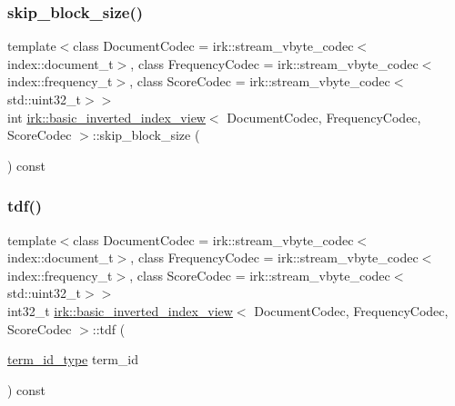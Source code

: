 \mbox{\label{classirk_1_1basic__inverted__index__view_a9d250a6240d62fcb5fa8c2287c6b9194}} 
\subsubsection{\texorpdfstring{skip\+\_\+block\+\_\+size()}{skip\_block\_size()}}
{\footnotesize\ttfamily template$<$class Document\+Codec  = irk\+::stream\+\_\+vbyte\+\_\+codec$<$index\+::document\+\_\+t$>$, class Frequency\+Codec  = irk\+::stream\+\_\+vbyte\+\_\+codec$<$index\+::frequency\+\_\+t$>$, class Score\+Codec  = irk\+::stream\+\_\+vbyte\+\_\+codec$<$std\+::uint32\+\_\+t$>$$>$ \\
int \mbox{\hyperlink{classirk_1_1basic__inverted__index__view}{irk\+::basic\+\_\+inverted\+\_\+index\+\_\+view}}$<$ Document\+Codec, Frequency\+Codec, Score\+Codec $>$\+::skip\+\_\+block\+\_\+size (\begin{DoxyParamCaption}{ }\end{DoxyParamCaption}) const\hspace{0.3cm}{\ttfamily [inline]}}

\mbox{\label{classirk_1_1basic__inverted__index__view_ad0616dba820e013107e4cad02d13d73f}} 
\subsubsection{\texorpdfstring{tdf()}{tdf()}}
{\footnotesize\ttfamily template$<$class Document\+Codec  = irk\+::stream\+\_\+vbyte\+\_\+codec$<$index\+::document\+\_\+t$>$, class Frequency\+Codec  = irk\+::stream\+\_\+vbyte\+\_\+codec$<$index\+::frequency\+\_\+t$>$, class Score\+Codec  = irk\+::stream\+\_\+vbyte\+\_\+codec$<$std\+::uint32\+\_\+t$>$$>$ \\
int32\+\_\+t \mbox{\hyperlink{classirk_1_1basic__inverted__index__view}{irk\+::basic\+\_\+inverted\+\_\+index\+\_\+view}}$<$ Document\+Codec, Frequency\+Codec, Score\+Codec $>$\+::tdf (\begin{DoxyParamCaption}\item[{\mbox{\hyperlink{classirk_1_1basic__inverted__index__view_a6b272abc76df208ce59bac93810e7331}{term\+\_\+id\+\_\+type}}}]{term\+\_\+id }\end{DoxyParamCaption}) const\hspace{0.3cm}{\ttfamily [inline]}}

